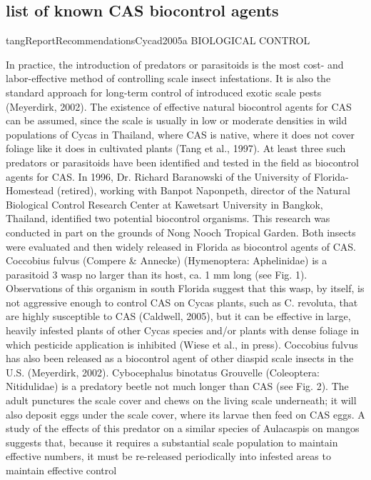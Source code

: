 \begin{appendices}
\subsection{list of known CAS biocontrol agents}
\begin{displaycquote}{tangReportRecommendationsCycad2005a}
BIOLOGICAL CONTROL

In practice, the introduction of predators or parasitoids is the most cost- and labor-effective method of
controlling scale insect infestations. It is also the standard approach for long-term control of introduced
exotic scale pests (Meyerdirk, 2002). The existence of effective natural biocontrol agents for CAS can be
assumed, since the scale is usually in low or moderate densities in wild populations of Cycas in Thailand,
where CAS is native, where it does not cover foliage like it does in cultivated plants (Tang et al., 1997).
At least three such predators or parasitoids have been identified and tested in the field as biocontrol agents
for CAS.
In 1996, Dr. Richard Baranowski of the University of Florida-Homestead (retired), working with Banpot
Naponpeth, director of the Natural Biological Control Research Center at Kawetsart University in
Bangkok, Thailand, identified two potential biocontrol organisms. This research was conducted in part on
the grounds of Nong Nooch Tropical Garden. Both insects were evaluated and then widely released in
Florida as biocontrol agents of CAS.
Coccobius fulvus (Compere \& Annecke) (Hymenoptera: Aphelinidae) is a parasitoid 3 wasp no larger than its
host, ca. 1 mm long (see Fig. 1). Observations of this organism in south Florida suggest that this wasp, by itself,
is not aggressive enough to control CAS on Cycas plants, such as C. revoluta, that are highly susceptible to
CAS (Caldwell, 2005), but it can be effective in large, heavily infested plants of other Cycas species and/or
plants with dense foliage in which pesticide application is inhibited (Wiese et al., in press). Coccobius fulvus
has also been released as a biocontrol agent of other diaspid scale insects in the U.S. (Meyerdirk, 2002).
Cybocephalus binotatus Grouvelle (Coleoptera: Nitidulidae) is a predatory beetle not much longer than CAS
(see Fig. 2). The adult punctures the scale cover and chews on the living scale underneath; it will also deposit
eggs under the scale cover, where its larvae then feed on CAS eggs. A study of the effects of this predator on a
similar species of Aulacaspis on mangos suggests that, because it requires a substantial scale population to
maintain effective numbers, it must be re-released periodically into infested areas to maintain effective control

\end{displaycquote}
\end{appendices}

